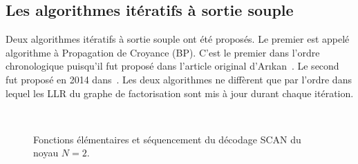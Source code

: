 \subsection{Les algorithmes itératifs à sortie souple}
\label{subsec:soft_algo}

Deux algorithmes itératifs à sortie souple ont été proposés. Le premier est appelé algorithme à Propagation de Croyance (BP). C'est le premier dans l'ordre chronologique puisqu'il fut proposé dans l'article original d'Ar{\i}kan~\cite{arikan_channel_2009}. Le second fut proposé en 2014 dans~\cite{fayyaz_low-complexity_2014}. Les deux algorithmes ne diffèrent que par l'ordre dans lequel les LLR du graphe de factorisation sont mis à jour durant chaque itération.

\begin{figure}[t]
  \renewcommand*\thesubfigure{\arabic{subfigure}} 
  \centering
  \hspace{2.5cm}
  \\
  \hspace{0.5cm}
  \hspace{3.7cm}
  \caption{Fonctions élémentaires et séquencement du décodage SCAN du noyau $N=2$.}
  \label{fig:SCANSchedule}
\end{figure}
